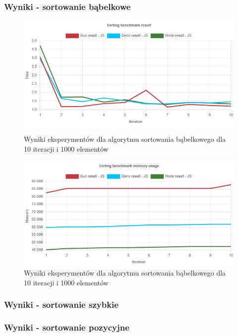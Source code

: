 \subsubsection{Wyniki - sortowanie bąbelkowe}
\begin{figure}[H]
    \includegraphics[width=\linewidth]{Figures/sorting/bubble/e1_js.png}
    \caption{Wyniki eksperymentów dla algorytmu sortowania bąbelkowego dla 10 iteracji i 1000 elementów}
    \label{fig:bubble_sorting_e1}
  \endminipage\hfill
  \includegraphics[width=\linewidth]{Figures/sorting/bubble/e1_memory_js.png}
  \caption{Wyniki eksperymentów dla algorytmu sortowania bąbelkowego dla 10 iteracji i 1000 elementów}
  \label{fig:bubble_sorting_e1_memory_js}
  \endminipage\hfill
\end{figure}

\subsubsection{Wyniki - sortowanie szybkie}

\subsubsection{Wyniki - sortowanie pozycyjne}

